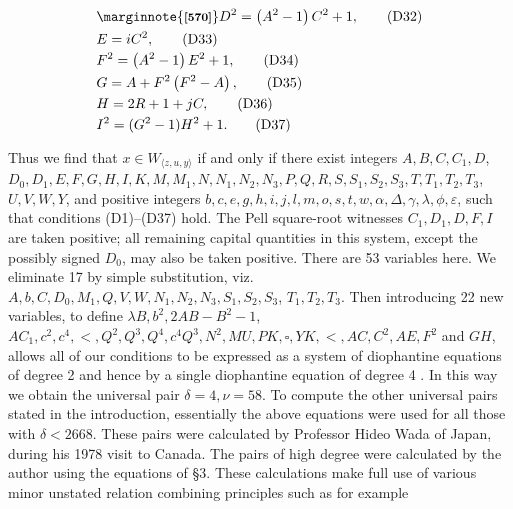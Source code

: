 \documentclass[11pt,a4paper]{article}
\newcommand{\origpage}[1]{\marginnote{\footnotesize\textbf{[#1]}}}
\begin{document}
\begin{align*}
& \origpage{570} D^{2}=\left(A^{2}-1\right) C^{2}+1,  \tag{D32}\\
& E=iC^{2}, \tag{D33}\\
& F^{2}=\left(A^{2}-1\right) E^{2}+1,  \tag{D34}\\
& G=A+F^{2}\left(F^{2}-A\right),  \tag{D35}\\
& H=2 R+1+j C,  \tag{D36}\\
& I^{2}=(G^{2}-1)H^{2}+1. \tag{D37}
\end{align*}


Thus we find that $x \in W_{\langle z, u, y\rangle}$ if and only if there exist integers $A,\allowbreak  B,\allowbreak  C,\allowbreak  C_{1},\allowbreak  D$, $D_{0},\allowbreak  D_{1},\allowbreak  E,\allowbreak  F,\allowbreak  G,\allowbreak  H,\allowbreak  I,\allowbreak  K,\allowbreak  M,\allowbreak  M_{1},\allowbreak  N,\allowbreak  N_1,\allowbreak N_2,\allowbreak N_3,\allowbreak  P,\allowbreak  Q,\allowbreak  R,\allowbreak  S,\allowbreak  S_{1},\allowbreak  S_{2},\allowbreak  S_{3},\allowbreak  T,\allowbreak  T_{1},\allowbreak  T_{2},\allowbreak  T_{3}$, $U,\allowbreak  V,\allowbreak  W,\allowbreak  Y$, and positive integers $b,\allowbreak  c,\allowbreak  e,\allowbreak  g,\allowbreak  h,\allowbreak  i,\allowbreak  j,\allowbreak  l,\allowbreak  m,\allowbreak  o,\allowbreak  s,\allowbreak  t,\allowbreak  w,\allowbreak  \alpha,\allowbreak  \Delta,\allowbreak  \gamma,\allowbreak  \lambda,\allowbreak  \phi,\allowbreak  \varepsilon$, such that conditions (D1)--(D37) hold. The Pell square-root witnesses $C_1,\allowbreak D_1,\allowbreak D,\allowbreak F,\allowbreak I$ are taken positive; all remaining capital quantities in this system, except the possibly signed $D_0$, may also be taken positive. There are 53 variables here. We eliminate 17 by simple substitution, viz. $A,\allowbreak  b,\allowbreak  C,\allowbreak  D_{0},\allowbreak  M_{1},\allowbreak  Q,\allowbreak  V,\allowbreak  W,\allowbreak  N_{1},\allowbreak  N_{2},\allowbreak  N_{3},\allowbreak  S_{1},\allowbreak  S_{2},\allowbreak  S_{3}$, $T_{1},\allowbreak  T_{2},\allowbreak  T_{3}$. Then introducing 22 new variables, to define $\lambda B,\allowbreak  b^{2},\allowbreak  2 A B-B^{2}-1$, $A C_{1},\allowbreak  c^{2},\allowbreak  c^{4},\allowbreak <,\allowbreak  Q^{2},\allowbreak  Q^{3},\allowbreak  Q^{4},\allowbreak  c^{4} Q^{3},\allowbreak  N^{2},\allowbreak  M U,\allowbreak  P K,\allowbreak  \square,\allowbreak  Y K,\allowbreak <,\allowbreak  A C,\allowbreak  C^{2},\allowbreak  A E,\allowbreak  F^{2}$ and $G H$, allows all of our conditions to be expressed as a system of diophantine equations of degree 2 and hence by a single diophantine equation of degree 4 . In this way we obtain the universal pair $\delta=4,\allowbreak  \nu=58$. To compute the other universal pairs stated in the introduction, essentially the above equations were used for all those with $\delta<2668$. These pairs were calculated by Professor Hideo Wada of Japan, during his 1978 visit to Canada. The pairs of high degree were calculated by the author using the equations of §3. These calculations make full use of various minor unstated relation combining principles such as for example
\end{document}
